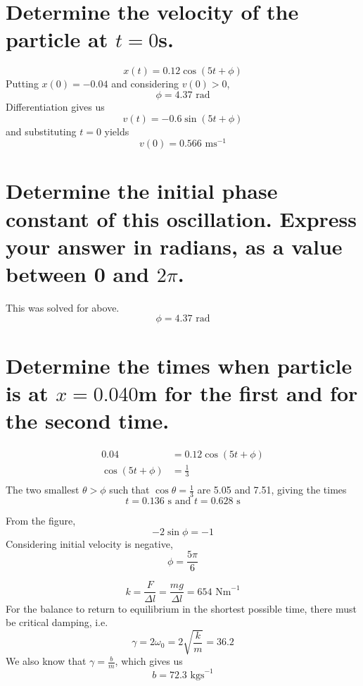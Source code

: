 \documentclass[answers]{exam}
\begin{document}
\begin{questions}
\begin{parts}
		\part{Determine the velocity of the particle at $t=0$s.}
		\begin{solution}
			$$x(t) = 0.12\cos(5t + \phi)$$
			Putting $x(0)=-0.04$ and considering $v(0) > 0$,
			$$\phi = 4.37 \text{ rad}$$
			Differentiation gives us
			$$v(t) = -0.6\sin(5t + \phi)$$
			and substituting $t=0$ yields
			$$v(0) = 0.566 \text{ ms}^{-1}$$
		\end{solution}
		\part{Determine the initial phase constant of this oscillation. Express your answer in radians, as a value between 0 and $2\pi$.}
		\begin{solution}
			This was solved for above.
			$$\phi = 4.37 \text{ rad}$$
		\end{solution}
		\part{Determine the times when particle is at $x=0.040$m for the first and for the second time.}
		\begin{solution}
			\begin{align*}
				0.04 &= 0.12\cos(5t+\phi) \\
				\cos(5t+\phi) &= \frac{1}{3} \\
			\end{align*}
			The two smallest $\theta > \phi$ such that $\cos\theta = \frac{1}{3}$ are 5.05 and 7.51, giving the times
			$$t = 0.136 \text{ s and } t = 0.628 \text{ s}$$
		\end{solution}
	\end{parts}

	\begin{solution}
		From the figure,
		$$-2\sin\phi = -1$$
		Considering initial velocity is negative,
		$$\phi = \frac{5\pi}{6}$$
	\end{solution}

	\begin{solution}
		$$k = \frac{F}{\Delta l} = \frac{mg}{\Delta l} = 654 \text{ Nm}^{-1}$$
		For the balance to return to equilibrium in the shortest possible time, there must be critical damping, i.e.
		$$\gamma = 2\omega_0 = 2\sqrt{\frac{k}{m}} = 36.2$$
		We also know that $\gamma = \frac{b}{m}$, which gives us
		$$b = 72.3 \text{ kgs}^{-1}$$
	\end{solution}


\end{questions}
\end{document}
